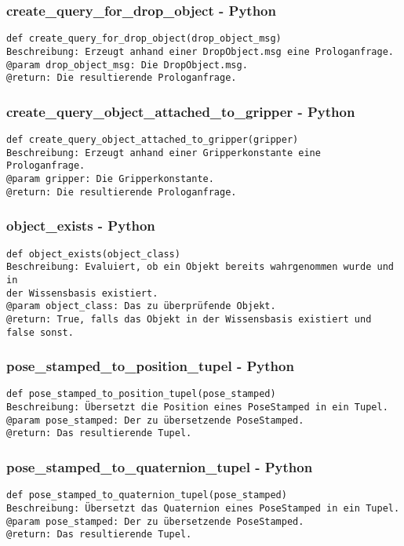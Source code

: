 \documentclass{suturo}
\begin{document}
\subsubsection{create\_query\_for\_drop\_object - Python}
\begin{verbatim}
def create_query_for_drop_object(drop_object_msg)
Beschreibung: Erzeugt anhand einer DropObject.msg eine Prologanfrage.
@param drop_object_msg: Die DropObject.msg.
@return: Die resultierende Prologanfrage.
\end{verbatim}

\subsubsection{create\_query\_object\_attached\_to\_gripper - Python}
\begin{verbatim}
def create_query_object_attached_to_gripper(gripper)
Beschreibung: Erzeugt anhand einer Gripperkonstante eine Prologanfrage.
@param gripper: Die Gripperkonstante.
@return: Die resultierende Prologanfrage.
\end{verbatim}

\subsubsection{object\_exists - Python}
\begin{verbatim}
def object_exists(object_class)
Beschreibung: Evaluiert, ob ein Objekt bereits wahrgenommen wurde und in 
der Wissensbasis existiert.
@param object_class: Das zu überprüfende Objekt.
@return: True, falls das Objekt in der Wissensbasis existiert und false sonst.
\end{verbatim}

\subsubsection{pose\_stamped\_to\_position\_tupel - Python}
\begin{verbatim}
def pose_stamped_to_position_tupel(pose_stamped)
Beschreibung: Übersetzt die Position eines PoseStamped in ein Tupel.
@param pose_stamped: Der zu übersetzende PoseStamped.
@return: Das resultierende Tupel.
\end{verbatim}

\subsubsection{pose\_stamped\_to\_quaternion\_tupel - Python}
\begin{verbatim}
def pose_stamped_to_quaternion_tupel(pose_stamped)
Beschreibung: Übersetzt das Quaternion eines PoseStamped in ein Tupel.
@param pose_stamped: Der zu übersetzende PoseStamped.
@return: Das resultierende Tupel.
\end{verbatim}
\end{document}
